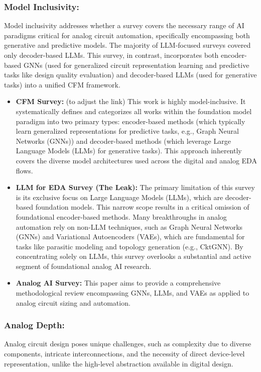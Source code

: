 \documentclass{ieeeaccess}
\begin{document}
\subsubsection{Model Inclusivity:} Model inclusivity addresses whether a survey covers the necessary range of AI paradigms critical for analog circuit automation, specifically encompassing both generative and predictive models.
The majority of LLM-focused surveys covered only decoder-based LLMs. This survey, in contrast, incorporates both encoder-based GNNs (used for generalized circuit representation learning and predictive tasks like design quality evaluation) and decoder-based LLMs (used for generative tasks) into a unified CFM framework.

    \begin{itemize}
    \item \textbf{CFM Survey:} (to adjust the link) This work is highly model-inclusive. It systematically defines and categorizes all works within the foundation model paradigm into two primary types: encoder-based methods (which typically learn generalized representations for predictive tasks, e.g., Graph Neural Networks (GNNs)) and decoder-based methods (which leverage Large Language Models (LLMs) for generative tasks). This approach inherently covers the diverse model architectures used across the digital and analog EDA flows.

    \item \textbf{LLM for EDA Survey (The Leak):} The primary limitation of this survey is its exclusive focus on Large Language Models (LLMs), which are decoder-based foundation models. This narrow scope results in a critical omission of foundational encoder-based methods. Many breakthroughs in analog automation rely on non-LLM techniques, such as Graph Neural Networks (GNNs) and Variational Autoencoders (VAEs), which are fundamental for tasks like parasitic modeling and topology generation (e.g., CktGNN). By concentrating solely on LLMs, this survey overlooks a substantial and active segment of foundational analog AI research.

    \item \textbf{Analog AI Survey:} This paper aims to provide a comprehensive methodological review encompassing GNNs, LLMs, and VAEs as applied to analog circuit sizing and automation.
    \end{itemize}

\subsubsection{Analog Depth:} Analog circuit design poses unique challenges, such as complexity due to diverse components, intricate interconnections, and the necessity of direct device-level representation, unlike the high-level abstraction available in digital design.
\end{document}
